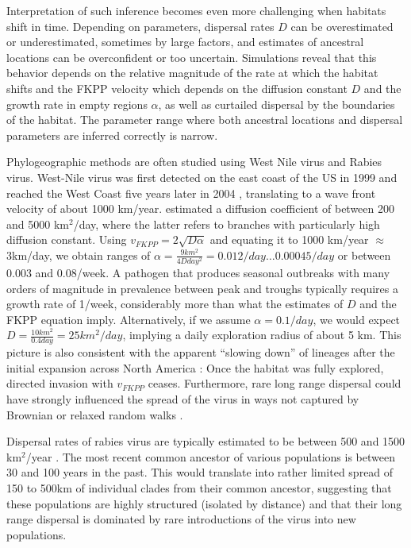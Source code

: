 \documentclass[aps,rmp, twocolumn]{revtex4}
\begin{document}
Interpretation of such inference becomes even more challenging when habitats shift in time.
Depending on parameters, dispersal rates $D$ can be overestimated or underestimated, sometimes by large factors, and estimates of ancestral locations can be overconfident or too uncertain.
Simulations reveal that this behavior depends on the relative magnitude of the rate at which the habitat shifts and the FKPP velocity which depends on the diffusion constant $D$ and the growth rate in empty regions $\alpha$, as well as curtailed dispersal by the boundaries of the habitat.
The parameter range where both ancestral locations and dispersal parameters are inferred correctly is narrow.

Phylogeographic methods are often studied using West Nile virus and Rabies virus.
West-Nile virus was first detected on the east coast of the US in 1999 and reached the West Coast five years later in 2004 \citep{pybus_unifying_2012}, translating to a wave front velocity of about 1000 km/year.
\citet{pybus_unifying_2012} estimated a diffusion coefficient of between 200 and 5000 km$^2$/day, where the latter refers to branches with particularly high diffusion constant.
Using $v_{FKPP} = 2\sqrt{D\alpha}$ and equating it to 1000 km/year $\approx$ 3km/day, we obtain ranges of $\alpha=\frac{9 km^2}{4 D day^2} = 0.012/day \ldots 0.00045/day$ or between $0.003$ and $0.08$/week.
A pathogen that produces seasonal outbreaks with many orders of magnitude in prevalence between peak and troughs typically requires a growth rate of 1/week, considerably more than what the estimates of $D$ and the FKPP equation imply.
Alternatively, if we assume $\alpha = 0.1/day$, we would expect $D = \frac{10 km^2}{0.4 day} = 25 km^2/day$, implying a daily exploration radius of about 5 km.
This picture is also consistent with the apparent ``slowing down'' of lineages after the initial expansion across North America \citep{dellicour_epidemiological_2020}: Once the habitat was fully explored, directed invasion with $v_{FKPP}$ ceases.
Furthermore, rare long range dispersal could have strongly influenced the spread of the virus in ways not captured by Brownian or relaxed random walks \citep{hallatschek_acceleration_2014}.

Dispersal rates of rabies virus are typically estimated to be between 500 and 1500 km$^2$/year \citep{dellicour_using_2017}.
The most recent common ancestor of various populations is between 30 and 100 years in the past.
This would translate into rather limited spread of 150 to 500km of individual clades from their common ancestor, suggesting that these populations are highly structured (isolated by distance) and that their long range dispersal is dominated by rare introductions of the virus into new populations.
\end{document}
